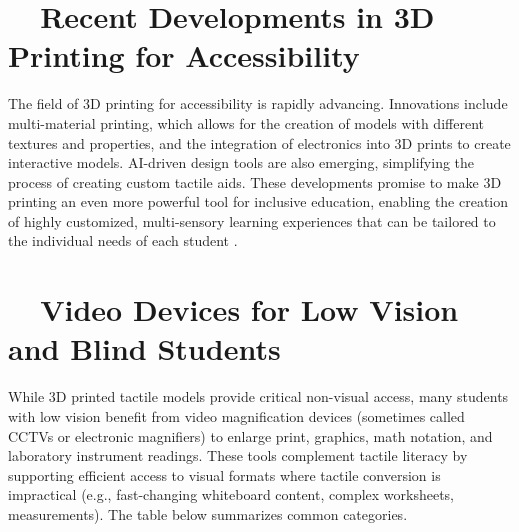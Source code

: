 \section{~~Recent Developments in 3D Printing for Accessibility}\label{ch5:sec:developments}
The field of 3D printing for accessibility is rapidly advancing. Innovations include multi-material printing, which allows for the creation of models with different textures and properties, and the integration of electronics into 3D prints to create interactive models. AI-driven design tools are also emerging, simplifying the process of creating custom tactile aids. These developments promise to make 3D printing an even more powerful tool for inclusive education, enabling the creation of highly customized, multi-sensory learning experiences that can be tailored to the individual needs of each student \supercite{Jo2016, LumaAI, Meshy}.

\section{~~Video  Devices for Low Vision and Blind Students}\label{ch5:sec:video-magnifiers}
While 3D printed tactile models provide critical non-visual access, many students with low vision benefit from video magnification devices (sometimes called CCTVs or electronic magnifiers) to enlarge print, graphics, math notation, and laboratory instrument readings. These tools complement tactile literacy by supporting efficient access to visual formats where tactile conversion is impractical (e.g., fast-changing whiteboard content, complex worksheets, measurements). The table below summarizes common categories.\supercite{PerkinsVideoMagnifier, Legge1985ReadingII, Legge1987ReadingIII}

